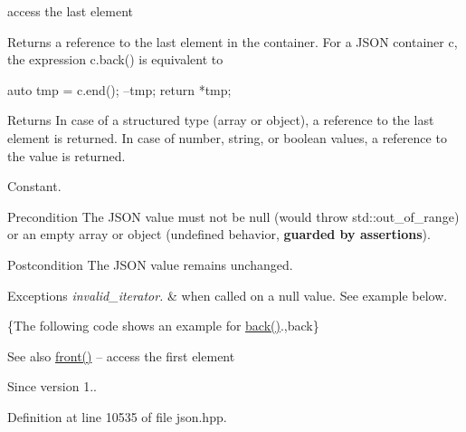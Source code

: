 access the last element 

Returns a reference to the last element in the container. For a J\+S\+ON container {\ttfamily c}, the expression {\ttfamily c.\+back()} is equivalent to 
\begin{DoxyCode}
\textcolor{keyword}{auto} tmp = c.end();
--tmp;
\textcolor{keywordflow}{return} *tmp;
\end{DoxyCode}


\begin{DoxyReturn}{Returns}
In case of a structured type (array or object), a reference to the last element is returned. In case of number, string, or boolean values, a reference to the value is returned.
\end{DoxyReturn}
Constant.

\begin{DoxyPrecond}{Precondition}
The J\+S\+ON value must not be {\ttfamily null} (would throw {\ttfamily std\+::out\+\_\+of\+\_\+range}) or an empty array or object (undefined behavior, {\bfseries guarded by assertions}). 
\end{DoxyPrecond}
\begin{DoxyPostcond}{Postcondition}
The J\+S\+ON value remains unchanged.
\end{DoxyPostcond}

\begin{DoxyExceptions}{Exceptions}
{\em invalid\+\_\+iterator.} & when called on a {\ttfamily null} value. See example below.\\
\hline
\end{DoxyExceptions}
\{The following code shows an example for {\ttfamily \hyperlink{classnlohmann_1_1basic__json_a011397134847f36db0ed7d7a93753677}{back()}}.,back\}

\begin{DoxySeeAlso}{See also}
\hyperlink{classnlohmann_1_1basic__json_a3acba9c6ceb7214e565fe08c3ba5b352}{front()} -- access the first element
\end{DoxySeeAlso}
\begin{DoxySince}{Since}
version 1.. 
\end{DoxySince}


Definition at line 10535 of file json.\+hpp.

